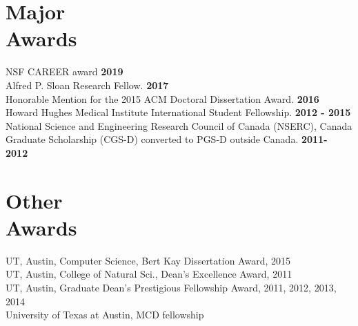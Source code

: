 \documentclass[margin,line,letterpaper]{resume}
\begin{document}
\begin{resume}

    \section{\mysidestyle Major \\Awards}
    NSF CAREER award \hfill \textbf{ 2019}\vspace{1mm}\\
    Alfred P. Sloan Research Fellow.\hfill \textbf{ 2017}\vspace{1mm}\\
    Honorable Mention for the 2015 ACM Doctoral Dissertation Award.\hfill \textbf{ 2016}\vspace{1mm}\\
     Howard Hughes Medical Institute International Student Fellowship. \hfill \textbf{2012 - 2015}\vspace{1mm}
     \\ National Science and Engineering Research Council of Canada (NSERC), 
     Canada Graduate Scholarship (CGS-D) converted to PGS-D outside Canada. \hfill \textbf{2011- 2012} 
     
     \section {\mysidestyle Other \\Awards}
     UT,  Austin, Computer Science, Bert Kay Dissertation Award, 2015\\
     UT,  Austin, College of Natural Sci., Dean's Excellence Award, 2011\\
     UT,  Austin, Graduate Dean's Prestigious Fellowship Award, 2011, 2012, 2013, 2014 
          \\ University of Texas at Austin, MCD fellowship %
    

\end{resume}
\end{document}
